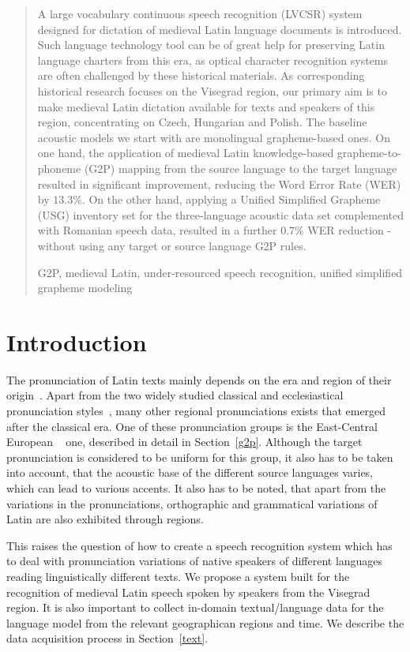 \documentclass[runningheads,a4paper]{llncs}
\newcommand{\keywords}[1]{\par\addvspace\baselineskip
\noindent\keywordname\enspace\ignorespaces#1}
\begin{document}
%
%
%
%
\begin{abstract}
A large vocabulary continuous speech recognition (LVCSR) system designed for dictation of medieval Latin language documents is introduced.
Such language technology tool can be of great help for preserving Latin language charters from this era, as optical character recognition systems are often challenged by these historical materials.
As corresponding historical research focuses on the Visegrad region, our primary aim is to make medieval Latin dictation available for texts and speakers of this region, concentrating on Czech, Hungarian and Polish.
The baseline acoustic models we start with are monolingual grapheme-based ones. 
On one hand, the application of medieval Latin knowledge-based grapheme-to-phoneme (G2P) mapping from the source language to the target language resulted in significant improvement, reducing the Word Error Rate (WER) by $13.3\%$. 
On the other hand, applying a Unified Simplified Grapheme (USG) inventory set for the three-language acoustic data set complemented with Romanian speech data, resulted in a further $0.7\%$ WER reduction - without using any target or source language G2P rules.
\keywords{G2P, medieval Latin, under-resourced speech recognition, unified simplified grapheme modeling}
\end{abstract}

\section{Introduction}
The pronunciation of Latin texts mainly depends on the era and region of their origin~\cite{regional}.
Apart from the two widely studied classical and ecclesiastical pronunciation styles~\cite{allen78}, many other regional pronunciations exists that emerged after the classical era.
One of these pronunciation groups is the East-Central European ~\cite{regional} one, described in detail in Section~\ref{g2p}.
Although the target pronunciation is considered to be uniform for this group, it also has to be taken into account, that the acoustic base of the different source languages varies, which can lead to various accents.
It also has to be noted, that apart from the variations in the pronunciations, orthographic and grammatical variations of Latin are also exhibited through regions.

This raises the question of how to create a speech recognition system which has to deal with pronunciation variations of native speakers of different languages reading linguistically different texts.
We propose a system built for the recognition of medieval Latin speech spoken by speakers from the Visegrad region.
It is also important to collect in-domain textual/language data for the language model from the relevant geographican regions and time.
We describe the data acquisition process in Section~\ref{text}.
\end{document}
